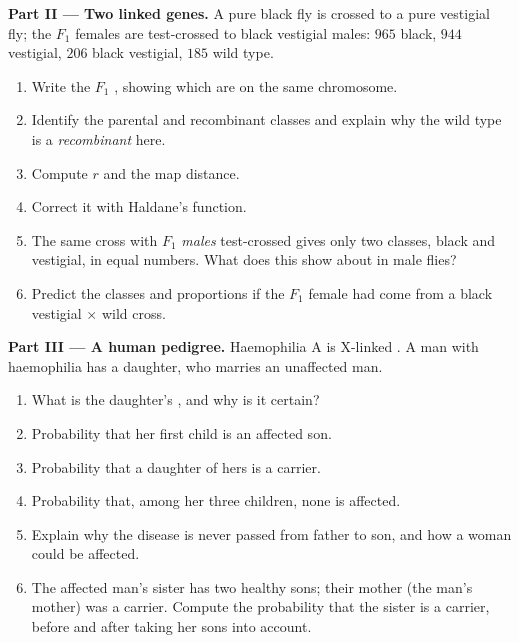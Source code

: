 \begin{problem}
\medskip
\noindent\textbf{Part II --- Two linked genes.}
A pure black fly is crossed to a pure vestigial fly; the $F_1$
females are test-crossed to black vestigial males: $965$ black,
$944$ vestigial, $206$ black vestigial, $185$ wild type.
\begin{enumerate}[resume]
  \item Write the $F_1$ , showing which  are on the
        same chromosome.
  \item Identify the parental and recombinant classes and explain
        why the wild type is a \emph{recombinant} here.
  \item Compute $r$ and the map distance.
  \item Correct it with Haldane's function.
  \item The same cross with $F_1$ \emph{males} test-crossed gives only
        two classes, black and vestigial, in equal numbers. What does
        this show about  in male flies?
  \item Predict the classes and proportions if the $F_1$ female had
        come from a black vestigial $\times$ wild cross.
\end{enumerate}

\medskip
\noindent\textbf{Part III --- A human pedigree.}
Haemophilia A is X-linked . A man with haemophilia has a
daughter, who marries an unaffected man.
\begin{enumerate}[resume]
  \item What is the daughter's , and why is it certain?
  \item Probability that her first child is an affected son.
  \item Probability that a daughter of hers is a carrier.
  \item Probability that, among her three children, none is
        affected.
  \item Explain why the disease is never passed from father to son,
        and how a woman could be affected.
  \item The affected man's sister has two healthy sons; their mother
        (the man's mother) was a carrier. Compute the probability that
        the sister is a carrier, before and after taking her sons into
        account.
\end{enumerate}


\end{problem}
